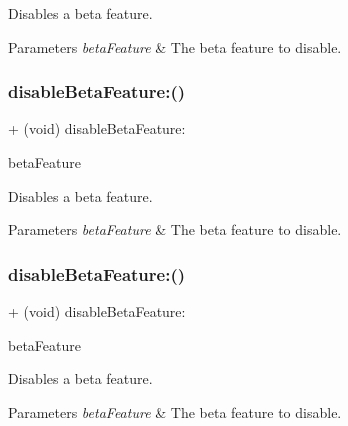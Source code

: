 Disables a beta feature.


\begin{DoxyParams}{Parameters}
{\em beta\+Feature} & The beta feature to disable. \\
\hline
\end{DoxyParams}
\mbox{\label{interfaceFBSettings_a6cc67de9d4b0069de4bfc6a3872f7114}} 
\subsubsection{\texorpdfstring{disable\+Beta\+Feature\+:()}{disableBetaFeature:()}\hspace{0.1cm}{\footnotesize\ttfamily [2/5]}}
{\footnotesize\ttfamily + (void) disable\+Beta\+Feature\+: \begin{DoxyParamCaption}\item[{(F\+B\+Beta\+Features)}]{beta\+Feature }\end{DoxyParamCaption}}

Disables a beta feature.


\begin{DoxyParams}{Parameters}
{\em beta\+Feature} & The beta feature to disable. \\
\hline
\end{DoxyParams}
\mbox{\label{interfaceFBSettings_a6cc67de9d4b0069de4bfc6a3872f7114}} 
\subsubsection{\texorpdfstring{disable\+Beta\+Feature\+:()}{disableBetaFeature:()}\hspace{0.1cm}{\footnotesize\ttfamily [3/5]}}
{\footnotesize\ttfamily + (void) disable\+Beta\+Feature\+: \begin{DoxyParamCaption}\item[{(F\+B\+Beta\+Features)}]{beta\+Feature }\end{DoxyParamCaption}}

Disables a beta feature.


\begin{DoxyParams}{Parameters}
{\em beta\+Feature} & The beta feature to disable. \\
\hline
\end{DoxyParams}
\mbox{\label{interfaceFBSettings_a6cc67de9d4b0069de4bfc6a3872f7114}} 
